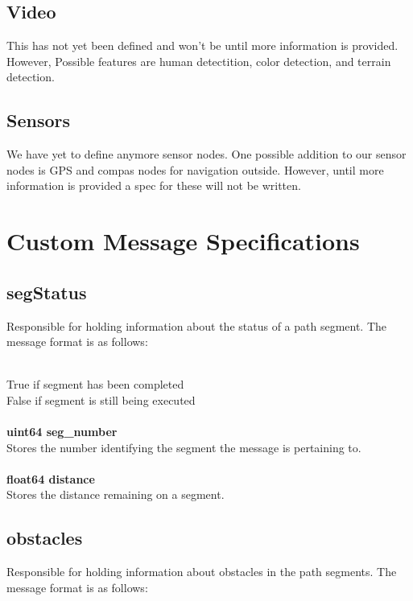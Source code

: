   \subsection{Video}
  This has not yet been defined and won't be until more information is
  provided. However, Possible features are human detectition, color detection, and terrain detection.

\subsection{Sensors}
We have yet to define anymore sensor nodes.  One possible addition to
our sensor nodes is GPS and compas nodes for navigation outside.
However, until more information is provided a spec for these will not
be written.

\section{Custom Message Specifications}

\subsection{segStatus}

Responsible for holding information about the status of a path
segment.  The message format is as follows:

\\
\indent True if segment has been completed\\
\indent False if segment is still being executed\\
\\
{\bf uint64 seg\_number}\\
\indent Stores the number identifying the segment the message is
pertaining to.\\
\\
{\bf float64 distance}\\
\indent Stores the distance remaining on a segment.\\

\subsection{obstacles}

Responsible for holding information about obstacles in the path
segments.  The message format is as follows:

